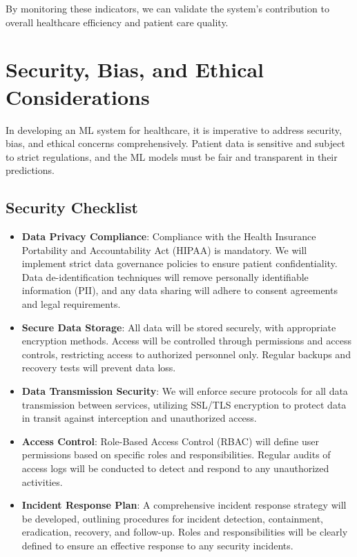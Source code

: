 \documentclass{article}
\begin{document}
By monitoring these indicators, we can validate the system's contribution to overall healthcare efficiency and patient care quality.

\section{Security, Bias, and Ethical Considerations}

In developing an ML system for healthcare, it is imperative to address security, bias, and ethical concerns comprehensively. Patient data is sensitive and subject to strict regulations, and the ML models must be fair and transparent in their predictions.

\subsection{Security Checklist}

\begin{itemize}[leftmargin=*]
    \item \textbf{Data Privacy Compliance}: Compliance with the Health Insurance Portability and Accountability Act (HIPAA) is mandatory. We will implement strict data governance policies to ensure patient confidentiality. Data de-identification techniques will remove personally identifiable information (PII), and any data sharing will adhere to consent agreements and legal requirements.
    \item \textbf{Secure Data Storage}: All data will be stored securely, with appropriate encryption methods. Access will be controlled through permissions and access controls, restricting access to authorized personnel only. Regular backups and recovery tests will prevent data loss.
    \item \textbf{Data Transmission Security}: We will enforce secure protocols for all data transmission between services, utilizing SSL/TLS encryption to protect data in transit against interception and unauthorized access.
    \item \textbf{Access Control}: Role-Based Access Control (RBAC) will define user permissions based on specific roles and responsibilities. Regular audits of access logs will be conducted to detect and respond to any unauthorized activities.
    \item \textbf{Incident Response Plan}: A comprehensive incident response strategy will be developed, outlining procedures for incident detection, containment, eradication, recovery, and follow-up. Roles and responsibilities will be clearly defined to ensure an effective response to any security incidents.
\end{itemize}
\end{document}
